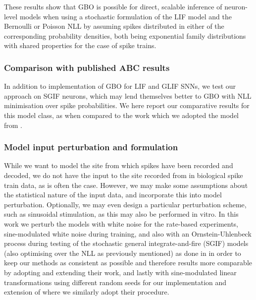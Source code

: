 \documentclass[mphil,deptreport,ianc]{infthesis} %
\begin{document}

These results show that GBO is possible for direct, scalable inference of neuron-level models when using a stochastic formulation of the LIF model and the Bernoulli or Poisson NLL by assuming spikes distributed in either of the corresponding probability densities, both being exponential family distributions with shared properties for the case of spike trains.



\subsubsection{Comparison with published ABC results}

In addition to implementation of GBO for LIF and GLIF SNNs, we test our approach on SGIF neurons, which may lend themselves better to GBO with NLL minimisation over spike probabilities. We here report our comparative results for this model class, as when compared to the work which we adopted the model from \cite{Rene2020}.

\subsubsection{Model input perturbation and formulation}

While we want to model the site from which spikes have been recorded and decoded, we do not have the input to the site recorded from in biological spike train data, as is often the case.
However, we may make some assumptions about the statistical nature of the input data, and incorporate this into model perturbation. Optionally, we may even design a particular perturbation scheme, such as sinusoidal stimulation, as this may also be performed in vitro.
In this work we perturb the models with white noise for the rate-based experiments, sine-modulated white noise during training, and also with an Ornstein-Uhlenbeck process during testing of the stochastic general integrate-and-fire (SGIF) models (also optimising over the NLL as previously mentioned) as done in \cite{Rene2020} in order to keep our methods as consistent as possible and therefore results more comparable by adopting and extending their work, and lastly with sine-modulated linear transformations using different random seeds for our implementation and extension of \cite{Huh2018} where we similarly adopt their procedure.
\end{document}
